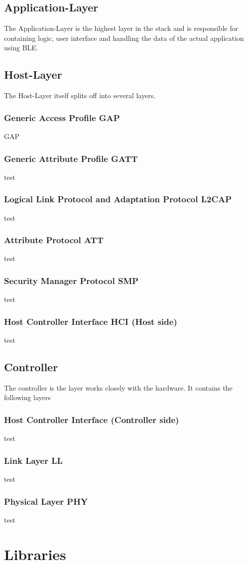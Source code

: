 \subsection{Application-Layer}
The Application-Layer is the highest layer in the stack and is responsible for containing logic, user interface and handling the data of the actual application using BLE.

\subsection{Host-Layer}
The Host-Layer itself splits off into several layers.

\subsubsection{Generic Access Profile GAP}
GAP

\subsubsection{Generic Attribute Profile GATT}
test

\subsubsection{Logical Link Protocol and Adaptation Protocol L2CAP}
test

\subsubsection{Attribute Protocol ATT}
test

\subsubsection{Security Manager Protocol SMP}
test

\subsubsection{Host Controller Interface HCI (Host side)}
test

\subsection{Controller}
The controller is the layer works closely with the hardware. It contains the following layers

\subsubsection{Host Controller Interface (Controller side)}
test
\subsubsection{Link Layer LL}
test
\subsubsection{Physical Layer PHY}
test

\section{Libraries}

\filbreak
